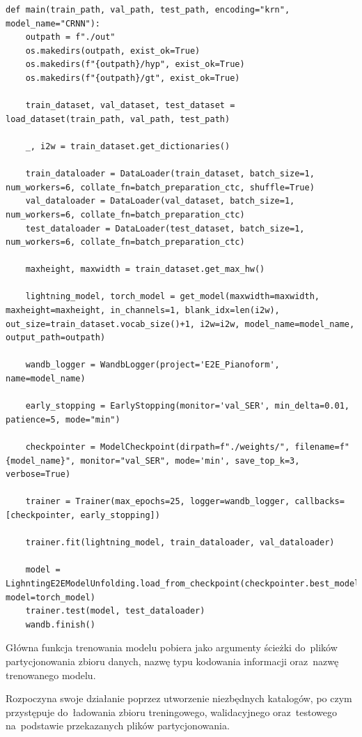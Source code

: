 \begin{lstlisting}[caption={Główna funkcja procesu uczenia modelu.}, label={model-training-main}]
def main(train_path, val_path, test_path, encoding="krn", model_name="CRNN"):
	outpath = f"./out"
	os.makedirs(outpath, exist_ok=True)
	os.makedirs(f"{outpath}/hyp", exist_ok=True)
	os.makedirs(f"{outpath}/gt", exist_ok=True)
	
	train_dataset, val_dataset, test_dataset = load_dataset(train_path, val_path, test_path)
	
	_, i2w = train_dataset.get_dictionaries()
	
	train_dataloader = DataLoader(train_dataset, batch_size=1, num_workers=6, collate_fn=batch_preparation_ctc, shuffle=True)
	val_dataloader = DataLoader(val_dataset, batch_size=1, num_workers=6, collate_fn=batch_preparation_ctc)
	test_dataloader = DataLoader(test_dataset, batch_size=1, num_workers=6, collate_fn=batch_preparation_ctc)
	
	maxheight, maxwidth = train_dataset.get_max_hw()
	
	lightning_model, torch_model = get_model(maxwidth=maxwidth, maxheight=maxheight, in_channels=1, blank_idx=len(i2w), out_size=train_dataset.vocab_size()+1, i2w=i2w, model_name=model_name, output_path=outpath)
	
	wandb_logger = WandbLogger(project='E2E_Pianoform', name=model_name)
	
	early_stopping = EarlyStopping(monitor='val_SER', min_delta=0.01, patience=5, mode="min")
	
	checkpointer = ModelCheckpoint(dirpath=f"./weights/", filename=f"{model_name}", monitor="val_SER", mode='min', save_top_k=3, verbose=True)
	
	trainer = Trainer(max_epochs=25, logger=wandb_logger, callbacks=[checkpointer, early_stopping])
	
	trainer.fit(lightning_model, train_dataloader, val_dataloader)
	
	model = LighntingE2EModelUnfolding.load_from_checkpoint(checkpointer.best_model_path, model=torch_model)
	trainer.test(model, test_dataloader)
	wandb.finish()
\end{lstlisting}

Główna funkcja trenowania modelu pobiera jako argumenty ścieżki do~plików partycjonowania zbioru danych, nazwę typu kodowania informacji oraz~nazwę trenowanego modelu.

Rozpoczyna swoje działanie poprzez utworzenie niezbędnych katalogów, po czym przystępuje do~ładowania zbioru treningowego, walidacyjnego oraz~testowego na~podstawie przekazanych plików partycjonowania. 

